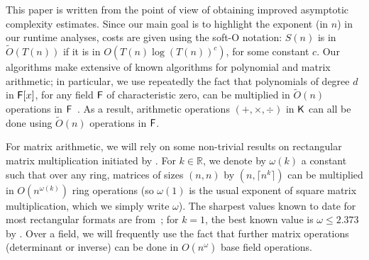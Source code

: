 This paper is written from the point of view of obtaining improved
asymptotic complexity estimates. Since our main goal is to highlight the
exponent (in $n$) in our runtime analyses, costs are given using the soft-O
notation: $S(n)$ is in $\tilde{O}(T(n))$ if it is in
$O(T(n) \log(T(n))^c)$, for some constant $c$. Our algorithms make
extensive of known algorithms for polynomial and matrix arithmetic; in
particular, we use repeatedly the fact that polynomials of degree $d$ in
${\mathsf{F}}[x]$, for any field ${\mathsf{F}}$ of characteristic zero, can be multiplied in
$\tilde{O}(n)$ operations in ${\mathsf{F}}$~\cite{ScSt71}. As a result, arithmetic 
operations $(+,\times,\div)$ in ${\mathsf{K}}$ can all be done using $\tilde{O}(n)$ 
operations in ${\mathsf{F}}$.

For matrix arithmetic, we will rely on some non-trivial results on
rectangular matrix multiplication initiated by . For $k \in
\mathbb{R}$, we denote by $\omega(k)$ a constant such that over any
ring, matrices of sizes $(n,n)$ by $(n,\lceil n^k \rceil)$ can be
multiplied in $O(n^{\omega(k)})$ ring operations (so $\omega(1)$ is
the usual exponent of square matrix multiplication, which we simply
write $\omega$).  The sharpest values known to date for most
rectangular formats are from~\cite{LeGall}; for $k=1$, the best known
value is $\omega \le 2.373$ by . Over a field, we will
frequently use the fact that further matrix operations (determinant or
inverse) can be done in $O(n^\omega)$ base field operations.


